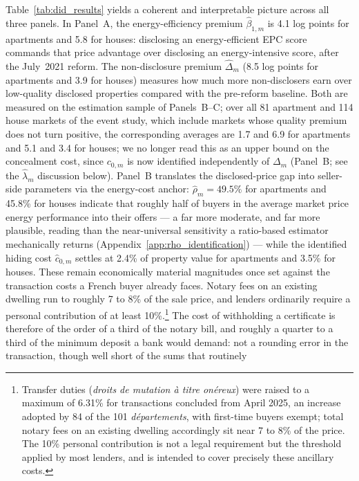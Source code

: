 Table~\ref{tab:did_results} yields a coherent and interpretable picture across all three panels.
In Panel~A, the energy-efficiency premium $\hat\beta_{1,m}$ is 4.1 log points for
apartments and 5.8 for houses: disclosing an energy-efficient EPC score commands that price advantage
over disclosing an energy-intensive score, after the July~2021 reform. The non-disclosure premium
$\hat\Delta_m$ (8.5 log points for apartments and 3.9 for houses) measures how much more
non-disclosers earn over low-quality disclosed properties compared with the pre-reform
baseline. Both are measured on the estimation sample of Panels~B--C; over all 81 apartment and 114 house
markets of the event study, which include markets whose quality premium does not turn positive, the
corresponding averages are 1.7 and 6.9 for apartments and 5.1 and 3.4 for houses; we no longer read this as an upper bound on the concealment cost, since $c_{0,m}$ is
now identified independently of $\Delta_m$ (Panel~B; see the $\hat\lambda_m$ discussion below).
Panel~B translates the disclosed-price gap into seller-side parameters via the energy-cost
anchor: $\hat\rho_m = 49.5\%$ for apartments and 45.8\% for houses indicate that roughly half of
buyers in the average market price energy performance into their offers --- a far more moderate,
and far more plausible, reading than the near-universal sensitivity a ratio-based estimator
mechanically returns (Appendix~\ref{app:rho_identification}) --- while the identified hiding
cost $\hat{c}_{0,m}$ settles at 2.4\% of property value for apartments and 3.5\% for houses.
These remain economically material magnitudes once set against the transaction costs a French
buyer already faces. Notary fees on an existing dwelling run to
roughly 7 to 8\% of the sale price, and lenders ordinarily require a personal contribution of at
least 10\%.\footnote{Transfer duties (\emph{droits de mutation \`a titre on\'ereux}) were raised
to a maximum of 6.31\% for transactions concluded from April 2025, an increase adopted by 84 of
the 101 \emph{d\'epartements}, with first-time buyers exempt; total notary fees on an existing
dwelling accordingly sit near 7 to 8\% of the price. The 10\% personal contribution is not a
legal requirement but the threshold applied by most lenders, and is intended to cover precisely
these ancillary costs.} The cost of withholding a certificate is therefore of the order of a
third of the notary bill, and roughly a quarter to a third of the minimum deposit a bank would
demand: not a rounding error in the transaction, though well short of the sums that routinely
